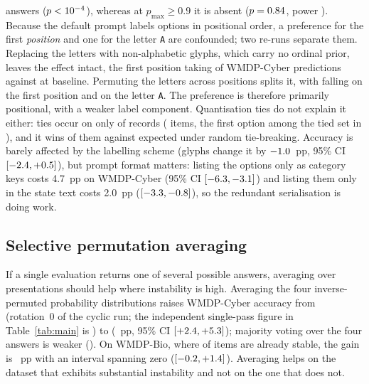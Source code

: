 \documentclass[conference,compsoc]{IEEEtran}
\newcommand{\pmax}{p_{\max}}
\begin{document}
answers ($p <10^{-4}{}$), whereas at $\pmax \geq 0.9$ it is absent ($p =
0.84{}$, power \statPosHighPower{}). Because the default prompt labels options in positional order, a preference for the
first \emph{position} and one for the letter \texttt{A} are confounded; two re-runs
separate them. Replacing the letters with non-alphabetic glyphs, which carry no ordinal
prior, leaves the effect intact, the first position taking \statAbSymCyber{} of WMDP-Cyber predictions against \statAbBaseCyber{} at baseline. Permuting the letters across
positions splits it, with \statAbShufPosCyber{} falling on the first position and
\statAbShufLetterCyber{} on the letter \texttt{A}. The preference is therefore primarily
positional, with a weaker label component. Quantisation ties do not explain it either: ties occur on only \statTieFrac{} of records
(\statTieTotal{} items, the first option among the tied set in
\statTieContainingFirst{}), and it wins \statTieObservedFirst{} of them against
\statTieExpectedFirst{} expected under random tie-breaking. Accuracy is barely affected by the labelling scheme (glyphs change it by
$-1.0{}$~pp, 95\% CI $[-2.4, +0.5]{}$), but prompt format
matters: listing the options only as category keys costs 4.7~pp on WMDP-Cyber (95\% CI
$[-6.3, -3.1]{}$) and listing them only in the state text costs 2.0~pp
($[-3.3, -0.8]{}$), so the redundant serialisation is doing work.

\subsection{Selective permutation averaging}
\label{sec:permavg}

If a single evaluation returns one of several possible answers, averaging over presentations
should help where instability is high. Averaging the four inverse-permuted probability distributions raises WMDP-Cyber accuracy
from \statSingleAccCyber{} (rotation~0 of the cyclic run; the independent single-pass
figure in Table~\ref{tab:main} is \statRCCyberBase{}) to \statEnsAccCyber{}
(\statEnsGainCyber{}~pp, 95\% CI $[+2.4{}, +5.3{}]$); majority
voting over the four answers is weaker (\statMajAccCyber{}). On WMDP-Bio, where
\statConsistBio{} of items are already stable, the gain is \statEnsGainBio{}~pp with an
interval spanning zero ($[-0.2{}, +1.4{}]$). Averaging helps on the
dataset that exhibits substantial instability and not on the one that does not.
\end{document}
